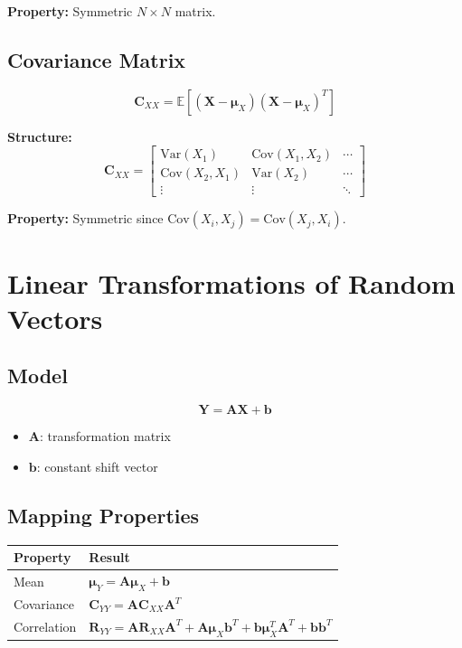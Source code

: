 \documentclass[11pt]{article}
\begin{document}
\textbf{Property:} Symmetric $N \times N$ matrix.

\subsection{Covariance Matrix}
\begin{equation}
\mathbf{C}_{XX} = \mathbb{E}[(\mathbf{X} - \boldsymbol{\mu}_X)(\mathbf{X} - \boldsymbol{\mu}_X)^T]
\end{equation}

\textbf{Structure:}
\begin{equation}
\mathbf{C}_{XX} =
\begin{bmatrix}
\mathrm{Var}(X_1) & \mathrm{Cov}(X_1,X_2) & \cdots \\
\mathrm{Cov}(X_2,X_1) & \mathrm{Var}(X_2) & \cdots \\
\vdots & \vdots & \ddots
\end{bmatrix}
\end{equation}

\textbf{Property:} Symmetric since $\mathrm{Cov}(X_i,X_j)=\mathrm{Cov}(X_j,X_i)$.

\section{Linear Transformations of Random Vectors}

\subsection{Model}
\begin{equation}
\mathbf{Y} = \mathbf{A}\mathbf{X} + \mathbf{b}
\end{equation}

\begin{itemize}
    \item $\mathbf{A}$: transformation matrix
    \item $\mathbf{b}$: constant shift vector
\end{itemize}

\subsection{Mapping Properties}

\begin{center}
\begin{tabular}{ll}
\toprule
Property & Result \\
\midrule
Mean & $\boldsymbol{\mu}_Y = \mathbf{A}\boldsymbol{\mu}_X + \mathbf{b}$ \\
Covariance & $\mathbf{C}_{YY} = \mathbf{A}\mathbf{C}_{XX}\mathbf{A}^T$ \\
Correlation & $\mathbf{R}_{YY} = \mathbf{A}\mathbf{R}_{XX}\mathbf{A}^T + \mathbf{A}\boldsymbol{\mu}_X \mathbf{b}^T + \mathbf{b}\boldsymbol{\mu}_X^T \mathbf{A}^T + \mathbf{b}\mathbf{b}^T$ \\
\bottomrule
\end{tabular}
\end{center}
\end{document}

